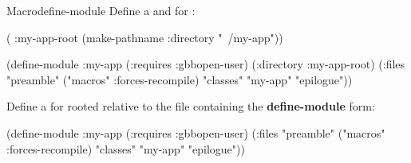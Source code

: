 \documentclass[10pt,twoside,english,pdftex]{article}
\begin{document}
\begin{functiondoc}{Macro}{define-module}{\superstar}
\fnexamples
{}%
Define a  and  for :
%
\W\supp
\begin{example}
  ( :my-app-root 
    (make-pathname :directory "~/my-app"))

  (define-module :my-app
    (:requires :gbbopen-user)
    (:directory :my-app-root)
    (:files "preamble"
            ("macros" :forces-recompile)
            "classes"
            "my-app"
            "epilogue"))
\end{example}

Define a  for  rooted relative to the file 
containing the \textbf{define-module} form:
%
\W\supp
\begin{example}
  (define-module :my-app
    (:requires :gbbopen-user)
    (:files "preamble"
            ("macros" :forces-recompile)
            "classes"
            "my-app"
            "epilogue"))
\end{example}

\end{functiondoc}

\end{document}
